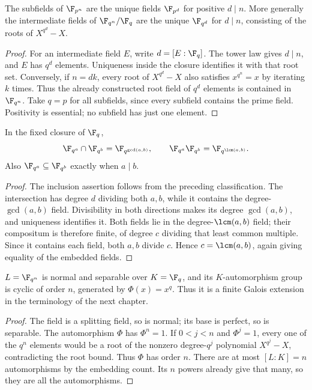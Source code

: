 \begin{theorem}
The subfields of $\F_{p^n}$ are the unique fields $\F_{p^d}$ for positive $d\mid n$. More generally the intermediate fields of $\F_{q^n}/\F_q$ are the unique $\F_{q^d}$ for $d\mid n$, consisting of the roots of $X^{q^d}-X$.
\end{theorem}
\begin{proof}
For an intermediate field $E$, write $d=[E:\F_q]$. The tower law gives $d\mid n$, and $E$ has $q^d$ elements. Uniqueness inside the closure identifies it with that root set. Conversely, if $n=dk$, every root of $X^{q^d}-X$ also satisfies $x^{q^n}=x$ by iterating $k$ times. Thus the already constructed root field of $q^d$ elements is contained in $\F_{q^n}$. Take $q=p$ for all subfields, since every subfield contains the prime field. Positivity is essential; no subfield has just one element.
\end{proof}

\begin{theorem}
In the fixed closure of $\F_q$,
\[\F_{q^a}\cap\F_{q^b}=\F_{q^{\gcd(a,b)}},\qquad
\F_{q^a}\F_{q^b}=\F_{q^{\lcm(a,b)}}.\]
Also $\F_{q^a}\subseteq\F_{q^b}$ exactly when $a\mid b$.
\end{theorem}
\begin{proof}
The inclusion assertion follows from the preceding classification. The intersection has degree $d$ dividing both $a,b$, while it contains the degree-$\gcd(a,b)$ field. Divisibility in both directions makes its degree $\gcd(a,b)$, and uniqueness identifies it. Both fields lie in the degree-$\lcm(a,b)$ field; their compositum is therefore finite, of degree $c$ dividing that least common multiple. Since it contains each field, both $a,b$ divide $c$. Hence $c=\lcm(a,b)$, again giving equality of the embedded fields.
\end{proof}

\begin{theorem}
$L=\F_{q^n}$ is normal and separable over $K=\F_q$, and its $K$-automorphism group is cyclic of order $n$, generated by $\Phi(x)=x^q$. Thus it is a finite Galois extension in the terminology of the next chapter.
\end{theorem}
\begin{proof}
The field is a splitting field, so is normal; its base is perfect, so is separable. The automorphism $\Phi$ has $\Phi^n=1$. If $0<j<n$ and $\Phi^j=1$, every one of the $q^n$ elements would be a root of the nonzero degree-$q^j$ polynomial $X^{q^j}-X$, contradicting the root bound. Thus $\Phi$ has order $n$. There are at most $[L:K]=n$ automorphisms by the embedding count. Its $n$ powers already give that many, so they are all the automorphisms.
\end{proof}


